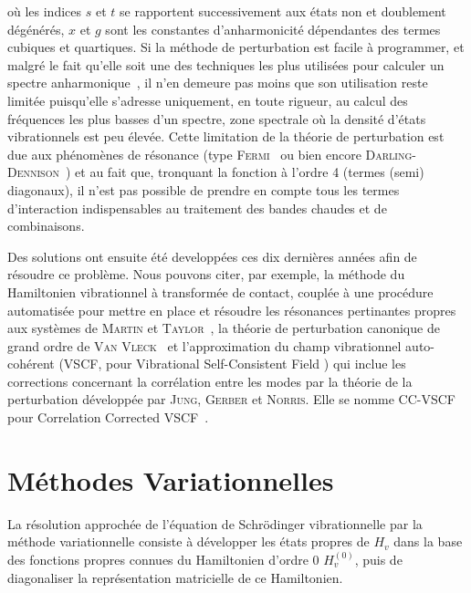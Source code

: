 \noindent où les indices $s$ et $t$ se rapportent successivement aux états non et doublement dégénérés, $x$ et $g$ sont les constantes d'anharmonicité dépendantes des termes cubiques et quartiques. Si la méthode de perturbation est facile à programmer, et malgré le fait qu'elle soit une des techniques les plus utilisées pour calculer un spectre anharmonique~\cite{gaussian}, il n'en demeure pas moins que son utilisation reste limitée puisqu'elle s'adresse uniquement, en toute rigueur, au calcul des fréquences les plus basses d'un spectre, zone spectrale où la densité d'états vibrationnels est peu élevée. Cette limitation de la théorie de perturbation est due aux phénomènes de résonance (type \textsc{Fermi}~\cite{II-25} ou bien encore \textsc{Darling-Dennison}~\cite{II-26}) et au fait que, tronquant la fonction à l'ordre 4 (termes (semi) diagonaux), il n'est pas possible de prendre en compte tous les termes d'interaction indispensables au traitement des bandes chaudes et de combinaisons.

Des solutions ont ensuite été developpées ces dix dernières années afin de résoudre ce problème. Nous pouvons citer, par exemple, la méthode du Hamiltonien vibrationnel à transformée de contact, couplée à une procédure automatisée pour mettre en place et résoudre les résonances pertinantes propres aux systèmes de \textsc{Martin} et \textsc{Taylor}~\cite{martin}, la théorie de perturbation canonique de grand ordre de \textsc{Van Vleck}~\cite{nielsen} et l'approximation du champ vibrationnel auto-cohérent (VSCF, pour \og Vibrational Self-Consistent Field \fg{}) qui inclue les corrections concernant la corrélation entre les modes par la théorie de la perturbation développée par \textsc{Jung}, \textsc{Gerber} et \textsc{Norris}. Elle se nomme CC-VSCF pour Correlation Corrected VSCF~\cite{ccvscf1,ccvscf2}. 


\section{Méthodes Variationnelles}\label{methodesvariationnelles}

La résolution approchée de l'équation de Schr\"{o}dinger vibrationnelle par la méthode variationnelle consiste à développer les états propres de $H_v$ dans la base des fonctions propres connues du Hamiltonien d'ordre 0 $H^{(0)}_v$, puis de diagonaliser la représentation matricielle de ce Hamiltonien. 

